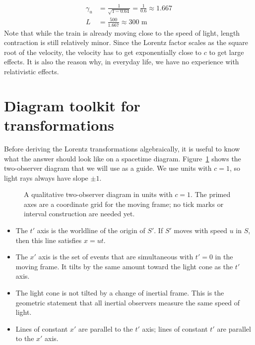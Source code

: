 \documentclass[12pt]{article}
\begin{document}
\begin{align*}
\gamma_u &= \frac{1}{\sqrt{1 - 0.64}} = \frac{1}{0.6} \approx 1.667 \\
L &= \frac{500}{1.667} \approx 300 \text{ m}
\end{align*}
Note that while the train is already moving close to the speed of light, length contraction is still relatively minor. Since the Lorentz factor scales as the square root of the velocity, the velocity has to get exponentially close to $c$ to get large effects. It is also the reason why, in everyday life, we have no experience with relativistic effects.

\section{Diagram toolkit for transformations}\label{sec:diagramtoolkit}
Before deriving the Lorentz transformations algebraically, it is useful to know what the answer should look like on a spacetime diagram. Figure~\ref{fig:two-observer-diagram} shows the two-observer diagram that we will use as a guide. We use units with $c=1$, so light rays always have slope $\pm 1$.

\begin{figure}
\centering
{}
\caption{A qualitative two-observer diagram in units with $c=1$. The primed axes are a coordinate grid for the moving frame; no tick marks or interval construction are needed yet.}
\label{fig:two-observer-diagram}
\end{figure}

\begin{itemize}
    \item The $t'$ axis is the worldline of the origin of $S'$. If $S'$ moves with speed $u$ in $S$, then this line satisfies $x=ut$.
    \item The $x'$ axis is the set of events that are simultaneous with $t'=0$ in the moving frame. It tilts by the same amount toward the light cone as the $t'$ axis.
    \item The light cone is not tilted by a change of inertial frame. This is the geometric statement that all inertial observers measure the same speed of light.
    \item Lines of constant $x'$ are parallel to the $t'$ axis; lines of constant $t'$ are parallel to the $x'$ axis.
\end{itemize}
\end{document}
